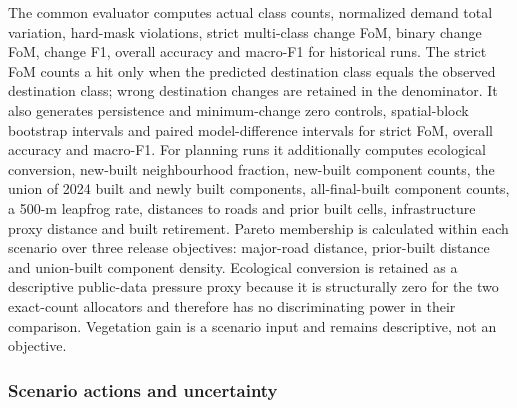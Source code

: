 The common evaluator computes actual class counts, normalized demand
total variation, hard-mask violations, strict multi-class change FoM,
binary change FoM, change F1, overall accuracy and macro-F1 for
historical runs. The strict FoM counts a hit only when the predicted
destination class equals the observed destination class; wrong
destination changes are retained in the denominator. It also generates
persistence and minimum-change zero controls, spatial-block bootstrap
intervals and paired model-difference intervals for strict FoM, overall
accuracy and macro-F1. For planning runs it additionally computes
ecological conversion, new-built neighbourhood fraction, new-built
component counts, the union of 2024 built and newly built components,
all-final-built component counts, a 500-m leapfrog rate, distances to
roads and prior built cells, infrastructure proxy distance and built
retirement. Pareto membership is calculated within each scenario over
three release objectives: major-road distance, prior-built distance and
union-built component density. Ecological conversion is retained as a
descriptive public-data pressure proxy because it is structurally zero
for the two exact-count allocators and therefore has no discriminating
power in their comparison. Vegetation gain is a scenario input and
remains descriptive, not an objective.

\subsubsection{Scenario actions and
uncertainty}\label{scenario-actions-and-uncertainty}

